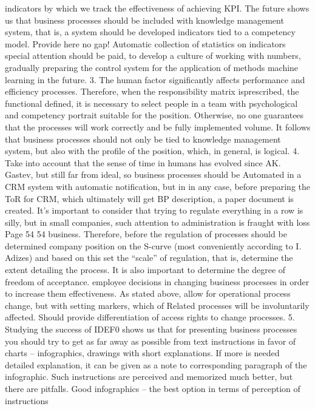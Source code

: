 indicators by which we track the effectiveness of achieving KPI.
The future shows us that business processes should be included with
knowledge management system, that is, a system should be developed
indicators tied to a competency model. Provide here
no gap! Automatic collection of statistics on indicators
special attention should be paid, to develop a culture of working with numbers,
gradually preparing the control system for the application of methods
machine learning in the future.
3. The human factor significantly affects performance and efficiency
processes. Therefore, when the responsibility matrix is ​​prescribed, the functional
defined, it is necessary to select people in a team with psychological and
competency portrait suitable for the position. Otherwise,
no one guarantees that the processes will work correctly and be fully implemented
volume.
It follows that business processes should not only be tied to
knowledge management system, but also with the profile of the position, which, in general,
is logical.
4. Take into account that the sense of time in humans has evolved since AK. Gastev, but
still far from ideal, so business processes should be
Automated in a CRM system with automatic notification, but in
in any case, before preparing the ToR for CRM, which ultimately will get
BP description, a paper document is created.
It’s important to consider that trying to regulate everything in a row is silly, but in
small companies, such attention to administration is fraught with loss
Page 54
54
business. Therefore, before the regulation of processes should be determined
company position on the S-curve (most conveniently according to I. Adizes) and based on this
set the “scale” of regulation, that is, determine the extent
detailing the process. It is also important to determine the degree of freedom of acceptance.
employee decisions in changing business processes in order to increase them
effectiveness. As stated above, allow for
operational process change, but with setting markers, which of
Related processes will be involuntarily affected. Should provide
differentiation of access rights to change processes.
5. Studying the success of IDEF0 shows us that for presenting business processes
you should try to get as far away as possible from text instructions in favor of
charts -- infographics, drawings with short explanations. If more is needed
detailed explanation, it can be given as a note to
corresponding paragraph of the infographic. Such instructions are perceived and
memorized much better, but there are pitfalls. Good
infographics -- the best option in terms of perception of instructions
